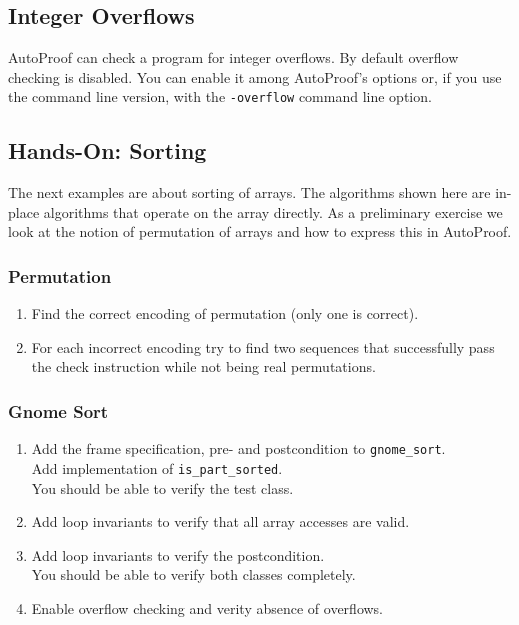 \documentclass[a4paper,12pt]{article}
\newcommand{\AutoProof}{Auto\-Proof\xspace}
\newcommand{\e}[1]{\mbox{\lstinline[language=Eiffel]|#1|}}
\begin{document}
\subsection{Integer Overflows} \label{sec:overflow}

\AutoProof can check a program for integer overflows. By default overflow checking is disabled. You can enable it among \AutoProof's options or, if you use the command line version, with the \e{-overflow} command line option.

\subsection{Hands-On: Sorting}

The next examples are about sorting of arrays. The algorithms shown here are in-place algorithms that operate on the array directly. As a preliminary exercise we look at the notion of permutation of arrays and how to express this in \AutoProof.

\subsubsection*{Permutation}

\begin{enumerate}[label=\bfseries Task \arabic*:, leftmargin=1.8cm]
\item Find the correct encoding of permutation (only one is correct).
\item For each incorrect encoding try to find two sequences that successfully pass the check instruction while not being real permutations.
\end{enumerate}

\subsubsection*{Gnome Sort}

\begin{enumerate}[label=\bfseries Task \arabic*:, leftmargin=1.8cm]
\item Add the frame specification, pre- and postcondition to \e{gnome_sort}. \\
      Add implementation of \e{is_part_sorted}. \\
      You should be able to verify the test class.
\item Add loop invariants to verify that all array accesses are valid.
\item Add loop invariants to verify the postcondition. \\
      You should be able to verify both classes completely.
\item Enable overflow checking and verity absence of overflows.
\end{enumerate}
\end{document}
